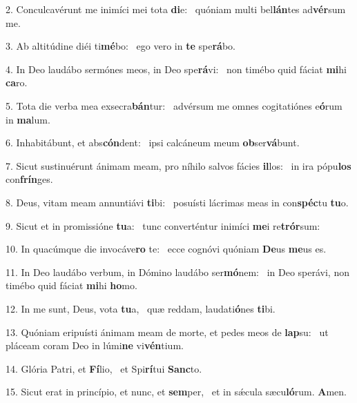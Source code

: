 2. Conculcavérunt me inimíci mei tota \textbf{di}e: \ast\  quóniam multi bel\textbf{lán}tes ad\textbf{vér}sum me.\

3. Ab altitúdine diéi ti\textbf{mé}bo: \ast\  ego vero in \textbf{te} spe\textbf{rá}bo.\

4. In Deo laudábo sermónes meos, in Deo spe\textbf{rá}vi: \ast\  non timébo quid fáciat \textbf{mi}hi \textbf{ca}ro.\

5. Tota die verba mea exsecra\textbf{bán}tur: \ast\  advérsum me omnes cogitatiónes e\textbf{ó}rum in \textbf{ma}lum.\

6. Inhabitábunt, et abs\textbf{cón}dent: \ast\  ipsi calcáneum meum \textbf{ob}ser\textbf{vá}bunt.\

7. Sicut sustinuérunt ánimam meam, pro níhilo salvos fácies \textbf{il}los: \ast\  in ira pópu\textbf{los} con\textbf{frín}ges.\

8. Deus, vitam meam annuntiávi \textbf{ti}bi: \ast\  posuísti lácrimas meas in con\textbf{spéc}tu \textbf{tu}o.\

9. Sicut et in promissióne \textbf{tu}a: \ast\  tunc converténtur inimíci \textbf{me}i re\textbf{trór}sum:\

10. In quacúmque die invocáve\textbf{ro} te: \ast\  ecce cognóvi quóniam \textbf{De}us \textbf{me}us es.\

11. In Deo laudábo verbum, in Dómino laudábo ser\textbf{mó}nem: \ast\  in Deo sperávi, non timébo quid fáciat \textbf{mi}hi \textbf{ho}mo.\

12. In me sunt, Deus, vota \textbf{tu}a, \ast\  quæ reddam, laudati\textbf{ó}nes \textbf{ti}bi.\

13. Quóniam eripuísti ánimam meam de morte, et pedes meos de \textbf{lap}su: \ast\  ut pláceam coram Deo in lúmi\textbf{ne} vi\textbf{vén}tium.\

14. Glória Patri, et \textbf{Fí}lio, \ast\  et Spi\textbf{rí}tui \textbf{Sanc}to.\

15. Sicut erat in princípio, et nunc, et \textbf{sem}per, \ast\  et in sǽcula sæcu\textbf{ló}rum. \textbf{A}men.\

